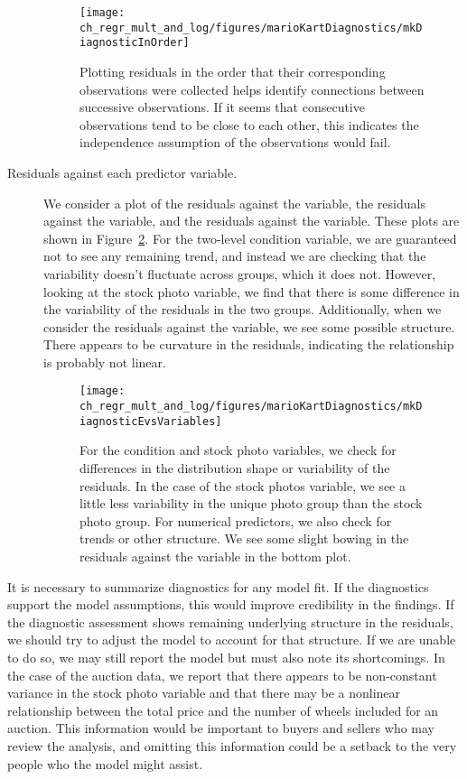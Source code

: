 \begin{description}
\begin{figure}[h]
\centering
\texttt{[image: ch\_regr\_mult\_and\_log/figures/marioKartDiagnostics/mkDiagnosticInOrder]}
\caption{Plotting residuals in the order that their corresponding observations were collected helps identify connections between successive observations. If it seems that consecutive observations tend to be close to each other, this indicates the independence assumption of the observations would fail.}
\label{mkDiagnosticInOrder}
\end{figure}

\item[Residuals against each predictor variable.] We consider a plot of the residuals against the  variable, the residuals against the  variable, and the residuals against the  variable. These plots are shown in Figure~\ref{mkDiagnosticEvsVariables}. For the two-level condition variable, we are guaranteed not to see any remaining trend, and instead we are checking that the variability doesn't fluctuate across groups, which it does not. However, looking at the stock photo variable, we find that there is some difference in the variability of the residuals in the two groups. Additionally, when we consider the residuals against the  variable, we see some possible structure. There appears to be curvature in the residuals, indicating the relationship is probably not linear.

\begin{figure}
\centering
\texttt{[image: ch\_regr\_mult\_and\_log/figures/marioKartDiagnostics/mkDiagnosticEvsVariables]}
\caption{For the condition and stock photo variables, we check for differences in the distribution shape or variability of the residuals. In the case of the stock photos variable, we see a little less variability in the unique photo group than the stock photo group. For numerical predictors, we also check for trends or other structure. We see some slight bowing in the residuals against the  variable in the bottom plot.}
\label{mkDiagnosticEvsVariables}
\end{figure}

\end{description}

It is necessary to summarize diagnostics for any model fit. If the diagnostics support the model assumptions, this would improve credibility in the findings. If the diagnostic assessment shows remaining underlying structure in the residuals, we should try to adjust the model to account for that structure. If we are unable to do so, we may still report the model but must also note its shortcomings. In the case of the auction data, we report that there appears to be non-constant variance in the stock photo variable and that there may be a nonlinear relationship between the total price and the number of wheels included for an auction. This information would be important to buyers and sellers who may review the analysis, and omitting this information could be a setback to the very people who the model might assist.

